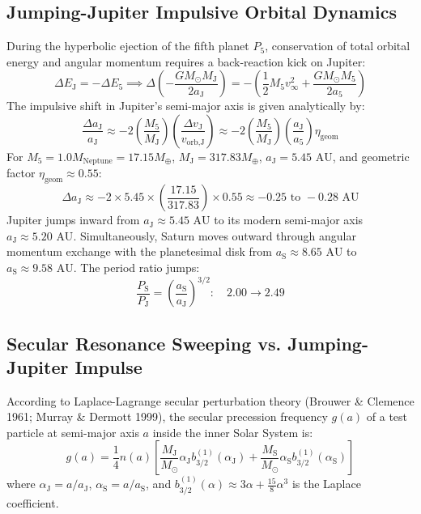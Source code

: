 \documentclass[11pt,a4paper]{article}
\begin{document}
\subsection{Jumping-Jupiter Impulsive Orbital Dynamics}
During the hyperbolic ejection of the fifth planet $P_5$, conservation of total orbital energy and angular momentum requires a back-reaction kick on Jupiter:
\begin{equation}
\Delta E_{\text{J}} = - \Delta E_5 \implies \Delta\left(-\frac{G M_\odot M_{\text{J}}}{2 a_{\text{J}}}\right) = -\left(\frac{1}{2} M_5 v_\infty^2 + \frac{G M_\odot M_5}{2 a_5}\right)
\end{equation}
The impulsive shift in Jupiter's semi-major axis is given analytically by:
\begin{equation}
\frac{\Delta a_{\text{J}}}{a_{\text{J}}} \approx -2 \left(\frac{M_5}{M_{\text{J}}}\right) \left(\frac{\Delta v_{\text{J}}}{v_{\text{orb,J}}}\right) \approx -2 \left(\frac{M_5}{M_{\text{J}}}\right) \left(\frac{a_{\text{J}}}{a_5}\right) \eta_{\text{geom}}
\end{equation}
For $M_5 = 1.0 M_{\text{Neptune}} = 17.15 M_\oplus$, $M_{\text{J}} = 317.83 M_\oplus$, $a_{\text{J}} = 5.45\text{ AU}$, and geometric factor $\eta_{\text{geom}} \approx 0.55$:
\begin{equation}
\Delta a_{\text{J}} \approx -2 \times 5.45 \times \left(\frac{17.15}{317.83}\right) \times 0.55 \approx -0.25\text{ to } -0.28\text{ AU}
\end{equation}
Jupiter jumps inward from $a_{\text{J}} \approx 5.45\text{ AU}$ to its modern semi-major axis $a_{\text{J}} \approx 5.20\text{ AU}$. Simultaneously, Saturn moves outward through angular momentum exchange with the planetesimal disk from $a_{\text{S}} \approx 8.65\text{ AU}$ to $a_{\text{S}} \approx 9.58\text{ AU}$. The period ratio jumps:
\begin{equation}
\frac{P_{\text{S}}}{P_{\text{J}}} = \left(\frac{a_{\text{S}}}{a_{\text{J}}}\right)^{3/2}: \quad 2.00 \longrightarrow 2.49
\end{equation}

\subsection{Secular Resonance Sweeping vs. Jumping-Jupiter Impulse}
According to Laplace-Lagrange secular perturbation theory (Brouwer \& Clemence 1961; Murray \& Dermott 1999), the secular precession frequency $g(a)$ of a test particle at semi-major axis $a$ inside the inner Solar System is:
\begin{equation}
g(a) = \frac{1}{4} n(a) \left[ \frac{M_{\text{J}}}{M_\odot} \alpha_{\text{J}} b_{3/2}^{(1)}(\alpha_{\text{J}}) + \frac{M_{\text{S}}}{M_\odot} \alpha_{\text{S}} b_{3/2}^{(1)}(\alpha_{\text{S}}) \right]
\end{equation}
where $\alpha_{\text{J}} = a / a_{\text{J}}$, $\alpha_{\text{S}} = a / a_{\text{S}}$, and $b_{3/2}^{(1)}(\alpha) \approx 3\alpha + \frac{15}{8}\alpha^3$ is the Laplace coefficient.
\end{document}
